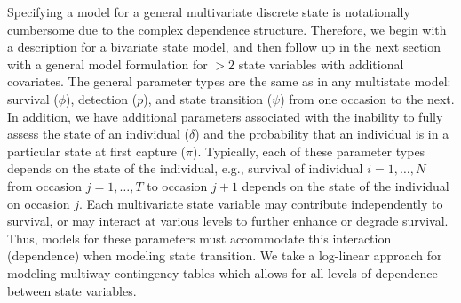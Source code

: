 \documentclass[fleqn]{article}
\begin{document}
Specifying a model for a general multivariate discrete state is notationally cumbersome due to the complex dependence structure. Therefore, we begin with a description for a bivariate state model, and then follow up in the next section with a general model formulation for $>2$ state variables with additional covariates. The general parameter types are the same as in any multistate model: survival ($\phi$), detection ($p$), and state transition ($\psi$) from one occasion to the next. In addition, we have additional parameters associated with the inability to fully assess the state of an individual ($\delta$) and the probability that an individual is in a particular state at first capture ($\pi$). Typically, each of these parameter types depends on the state of the individual, e.g., survival of individual $i=1,\dots,N$ from occasion $j=1,\dots,T$ to occasion $j+1$ depends on the state of the individual on occasion $j$. Each multivariate state variable may contribute independently to survival, or may interact at various levels to further enhance or degrade survival. Thus, models for these parameters must accommodate this interaction (dependence) when modeling state transition. We take a log-linear approach \citep{christensen1997log} for modeling multiway contingency tables which allows for all levels of dependence between state variables.     
\end{document}
